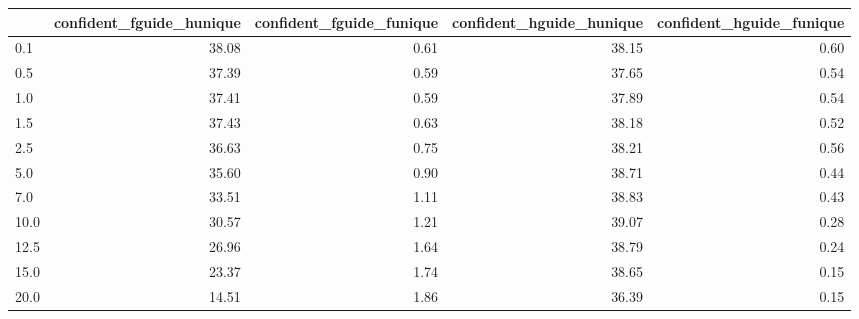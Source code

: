 \begin{tabular}{lrrrr}
\toprule
 & confident_fguide_hunique & confident_fguide_funique & confident_hguide_hunique & confident_hguide_funique \\
\midrule
0.1 & 38.08 & 0.61 & 38.15 & 0.60 \\
0.5 & 37.39 & 0.59 & 37.65 & 0.54 \\
1.0 & 37.41 & 0.59 & 37.89 & 0.54 \\
1.5 & 37.43 & 0.63 & 38.18 & 0.52 \\
2.5 & 36.63 & 0.75 & 38.21 & 0.56 \\
5.0 & 35.60 & 0.90 & 38.71 & 0.44 \\
7.0 & 33.51 & 1.11 & 38.83 & 0.43 \\
10.0 & 30.57 & 1.21 & 39.07 & 0.28 \\
12.5 & 26.96 & 1.64 & 38.79 & 0.24 \\
15.0 & 23.37 & 1.74 & 38.65 & 0.15 \\
20.0 & 14.51 & 1.86 & 36.39 & 0.15 \\
\bottomrule
\end{tabular}
